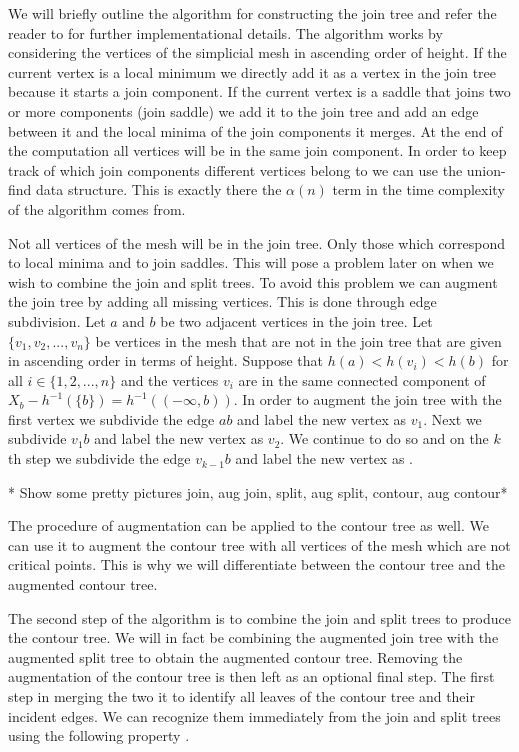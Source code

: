 

We will briefly outline the algorithm for constructing the join tree and refer the reader to \cite{ct-big-paper} for further implementational details. The algorithm works by considering the vertices of the simplicial mesh in ascending order of height. If the current vertex is a local minimum we directly add it as a vertex in the join tree because it starts a join component. If the current vertex is a saddle that joins two or more components (join saddle) we add it to the join tree and add an edge between it and the local minima of the join components it merges. At the end of the computation all vertices will be in the same join component. In order to keep track of which join components different vertices belong to we can use the union-find data structure. This is exactly there the $\alpha(n)$ term in the time complexity of the algorithm comes from.

Not all vertices of the mesh will be in the join tree. Only those which correspond to local minima and to join saddles. This will pose a problem later on when we wish to combine the join and split trees. To avoid this problem we can augment the join tree by adding all missing vertices. This is done through edge subdivision. Let $a \text{ and } b$ be two adjacent vertices in the join tree.  Let $\{v_1, v_2, ..., v_n\}$ be vertices in the mesh that are not in the join tree that are given in ascending order in terms of height.  Suppose that $h(a) < h(v_i) < h(b)$ for all $i \in \{1, 2, ..., n\}$ and the vertices $v_i$ are in the same connected component of $X_b - h^{-1}(\{b\}) = h^{-1}((-\infty, b))$. In order to augment the join tree with the first vertex we subdivide the edge $ab$ and label the new vertex as $v_1$. Next we subdivide $v_1b$ and label the new vertex as $v_2$. We continue to do so and on the $k$th step we subdivide the edge
$ v_{k-1}b $ and label the new vertex as .

* Show some pretty pictures join, aug join, split, aug split, contour, aug contour*

The procedure of augmentation can be applied to the contour tree as well. We can use it to augment the contour tree with all vertices of the mesh which are not critical points. This is why we will differentiate between the contour tree and the augmented contour tree.

The second step of the algorithm is to combine the join and split trees to produce the contour tree. We will in fact be combining the augmented join tree with the augmented split tree to obtain the augmented contour tree. Removing the augmentation of the contour tree is then left as an optional final step. The first step in merging the two it to identify all leaves of the contour tree and their incident edges. We can recognize them immediately from the join and split trees using the following property \cite{carr-masters}.

